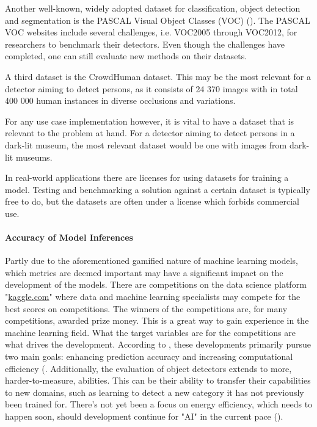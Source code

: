 Another well-known, widely adopted dataset for classification, object detection and segmentation is the PASCAL Visual Object Classes (VOC) (\cite{ev2010pascaldataset}). The PASCAL VOC websites include several challenges, i.e. VOC2005 through VOC2012, for researchers to benchmark their detectors. Even though the challenges have completed, one can still evaluate new methods on their datasets.

A third dataset is the CrowdHuman dataset. This may be the most relevant for a detector aiming to detect persons, as it consists of 24 370 images with in total 400 000 human instances in diverse occlusions and variations.

For any use case implementation however, it is vital to have a dataset that is relevant to the problem at hand. For a detector aiming to detect persons in a dark-lit museum, the most relevant dataset would be one with images from dark-lit museums.

In real-world applications there are licenses for using datasets for training a model. Testing and benchmarking a solution against a certain dataset is typically free to do, but the datasets are often under a license which forbids commercial use.

\paragraph{Accuracy of Model Inferences}
\label{sec:accuracy_of_model_inferences}
Partly due to the aforementioned gamified nature of machine learning models, which metrics are deemed important may have a significant impact on the development of the models. There are competitions on the data science platform "\href{Kaggle}{kaggle.com}" where data and machine learning specialists may compete for the best scores on competitions. The winners of the competitions are, for many competitions, awarded prize money. This is a great way to gain experience in the machine learning field. What the target variables are for the competitions are what drives the development. According to \citeauthor{zou2023object_detection_in_20_years}, these developments primarily pursue two main goals: enhancing prediction accuracy and increasing computational efficiency (\citeyear{zou2023object_detection_in_20_years}. Additionally, the evaluation of object detectors extends to more, harder-to-measure, abilities. This can be their ability to transfer their capabilities to new domains, such as learning to detect a new category it has not previously been trained for. There's not yet been a focus on energy efficiency, which needs to happen soon, should development continue for "AI" in the current pace (\cite{lu2023AIenergyefficieny}).

